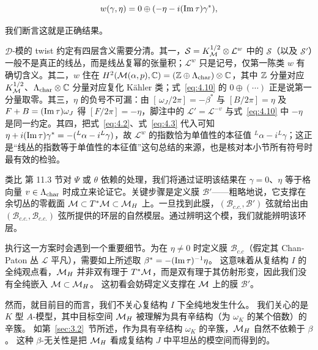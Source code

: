 \setcounter{equation}{9}
\begin{equation}\label{eq:4.10}
  w(\gamma,\eta)=0\oplus (-\eta-i({\rm Im}\,\tau)\gamma^*),
\end{equation}

我们断言这就是正确结果。

\begin{yizhu}[易错点]
${\mathcal D}$-模的 twist 约定有四层含义需要分清。其一，${\mathcal S}=K_{\mathcal{M}}^{1/2}\otimes{\mathcal L}^w$ 中的 ${\mathcal S}$（以及 ${\mathcal S}'$）一般不是真正的线丛，而是线丛复幂的张量积；${\mathcal L}^w$ 只是记号，仅第一陈类 $w$ 有确切含义。其二，$w$ 住在 $H^2({\mathcal{M}}(\alpha,p),{\mathbb{C}})=({\mathbb{Z}}\oplus\Lambda_{\rm char})\otimes{\mathbb{C}}$，其中 ${\mathbb{Z}}$ 分量对应 $K_{\mathcal{M}}^{1/2}$、$\Lambda_{\rm char}\otimes{\mathbb{C}}$ 分量对应复化 Kähler 类；式~\eqref{eq:4.10} 的 $0\oplus(\cdots)$ 正是说第一分量取零。其三，$\eta$ 的负号不可漏：由 $[\,\omega_J/2\pi]=-\beta^*$ 与 $[B/2\pi]=\eta$ 及 $F+B=({\rm Im}\,\tau)\omega_J$ 得 $[F/2\pi]=-\eta$，脚注中的 ${\mathcal L}'={\mathcal L}^{-v}$ 与式~\eqref{eq:4.10} 中 $-\eta$ 是同一约定。其四，把式~\eqref{eq:4.2}、式~\eqref{eq:4.3} 代入可知 $\eta+i({\rm Im}\,\tau)\gamma^*=-({}^L\alpha-i{}^L\gamma)$，故 ${\mathcal L}^w$ 的指数恰为单值性的本征值 ${}^L\alpha-i{}^L\gamma$；这正是“线丛的指数等于单值性的本征值”这句总结的来源，也是核对本小节所有符号时最有效的检验。
\end{yizhu}


类比 \cite{ref8} 第 11.3 节对 $\Psi$ 或 $\theta$ 依赖的处理，我们将通过证明该结果在 $\gamma=0$、$\eta$ 等于格向量 $v\in \Lambda_{\rm char}$ 时成立来论证它。关键步骤是定义膜 ${\mathcal B}'$——粗略地说，它支撑在余切丛的零截面 ${\mathcal{M}}\subset T^*{\mathcal{M}}\subset {{\mathcal{M}}_H}$ 上。一旦找到此膜，$({\mathcal B}_{c.c.},{\mathcal B}')$ 弦就给出由
$({\mathcal B}_{c.c.},{\mathcal B}_{c.c.})$ 弦所提供的环层的自然模层。通过辨明这个模，我们就能辨明该环层。

执行这一方案时会遇到一个重要细节。为在 $\eta\not=0$ 时定义膜
${\mathcal B}_{c.c}$（假定其 Chan-Paton 丛 ${\mathcal L}$ 平凡），需要如上所述取 $\beta^*=-({\rm Im}\,\tau)^{-1}\eta$。
这意味着从复结构 $I$ 的全纯观点看，${{\mathcal{M}}_H}$ 并非双有理于 $T^*{\mathcal{M}}$，而是双有理于其仿射形变，因此我们没有全纯嵌入 ${\mathcal{M}}\subset{{\mathcal{M}}_H}$。
这初看会妨碍定义支撑在 ${\mathcal{M}}$ 上的膜 ${\mathcal B}'$。

然而，就目前目的而言，我们不关心复结构 $I$ 下全纯地发生什么。
我们关心的是 $K$ 型 $A$-模型，其中目标空间 ${{\mathcal{M}}_H}$ 被理解为具有辛结构（为 $\omega_K$ 的某个倍数）的辛簇。
如第~\ref{sec:3.2}~节所述，作为具有辛结构 $\omega_K$ 的辛簇，${{\mathcal{M}}_H}$ 自然不依赖于 $\beta$。
这种 $\beta$-无关性是把 ${{\mathcal{M}}_H}$ 看成复结构 $J$ 中平坦丛的模空间而得到的。

